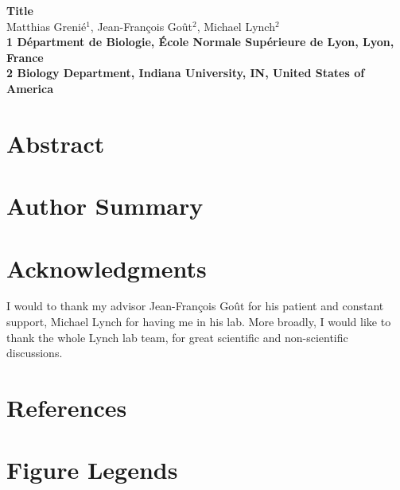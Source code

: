 \documentclass[10pt]{article}
\date{}
\begin{document}
\begin{flushleft}
{\Large
\textbf{Title}
}
\\
Matthias Grenié$^{1}$, 
Jean-François Goût$^{2}$, 
Michael Lynch$^{2}$
\\
\bf{1} Départment de Biologie, École Normale Supérieure de Lyon, Lyon, France
\\
\bf{2} Biology Department, Indiana University, IN, United States of America
\\
\end{flushleft}

\section*{Abstract}

\section*{Author Summary}









\section*{Acknowledgments}

I would to thank my advisor Jean-François Goût for his patient and constant support, Michael Lynch for having me in his lab. More broadly, I would like to thank the whole Lynch lab team, for great scientific and non-scientific discussions.

\section*{References}


\section*{Figure Legends}
\end{document}
